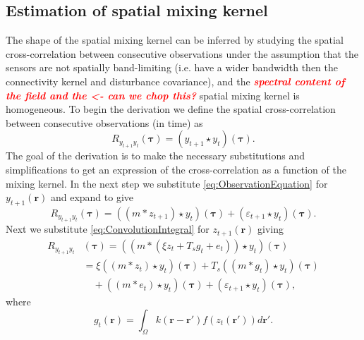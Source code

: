 \documentclass[10pt,twocolumn,twoside]{IEEEtran}
\newcommand{\dean}[1]{\textsf{\emph{\textbf{\textcolor{red}{#1}}}}}
\begin{document}
\subsection{Estimation of spatial mixing kernel} 
The shape of the spatial mixing kernel can be inferred by studying the spatial cross-correlation between consecutive observations under the assumption that the sensors are not spatially band-limiting (i.e. have a wider bandwidth then the connectivity kernel and disturbance covariance), and the \dean{spectral content of the field and the <- can we chop this?} spatial mixing kernel is homogeneous.  To begin the derivation we define the spatial cross-correlation between consecutive observations (in time) as  
\begin{equation}
	R_{y_{t+1}y_t}(\boldsymbol{\tau}) = \left(y_{t+1}\star y_t\right)\left(\boldsymbol{\tau}\right).
\end{equation}
The goal of the derivation is to make the necessary substitutions and simplifications to get an expression of the cross-correlation as a function of the mixing kernel. In the next step we substitute \eqref{eq:ObservationEquation} for $y_{t+1}(\mathbf{r})$ and expand to give
\begin{equation}
	R_{y_{t+1}y_t}\left(\boldsymbol{\tau}\right) = \left(\left(m \ast z_{t+1}\right)\star y_t\right)\left(\boldsymbol{\tau}\right) + \left(\varepsilon_{t+1} \star y_t\right)\left(\boldsymbol{\tau}\right).
\end{equation}
Next we substitute \eqref{eq:ConvolutionIntegral} for $z_{t+1}(\mathbf{r})$ giving 
\begin{align}
	R_{y_{t+1}y_t}&(\boldsymbol{\tau}) = (\left(m \ast \left(\xi z_t +  T_s g_t + e_t\right)\right) \star y_t)(\boldsymbol{\tau}) \nonumber\\
	&= \xi\left(\left(m \ast z_t\right) \star y_t \right)(\boldsymbol{\tau})+ T_s \left(\left(m\ast g_t\right)\star y_t \right)(\boldsymbol{\tau}) \nonumber\\
	&\quad+ \left(\left(m\ast e_t\right)\star y_t \right)(\boldsymbol{\tau})+ (\varepsilon_{t+1} \star y_t)(\boldsymbol{\tau}),
\end{align}
where
\begin{equation}\label{eq:averagefiringrate}
	g_t(\mathbf r)=\int_{\Omega}k\left(\mathbf{r}-\mathbf{r}'\right)f(z_{t}\left(\mathbf{r}'\right))d\mathbf{r}'.
\end{equation}
\end{document}
